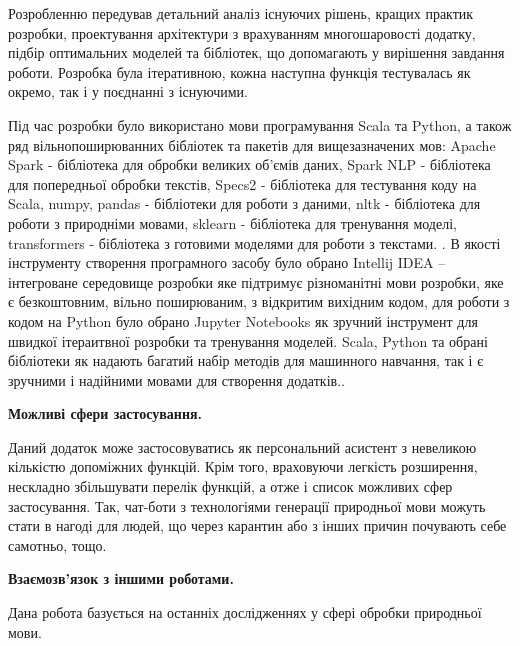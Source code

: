 Розробленню передував детальний аналіз існуючих рішень, кращих практик розробки, проектування архітектури з врахуванням многошаровості додатку, підбір оптимальних моделей та бібліотек, що допомагають у вирішення завдання роботи. Розробка була ітеративною, кожна наступна функція тестувалась як окремо, так і у поєднанні з існуючими.


Під час розробки було використано мови програмування Scala та Python, а також ряд вільнопоширюванних бібліотек та пакетів для вищезазначених мов: Apache Spark - бібліотека для обробки великих об’ємів даних, Spark NLP - бібліотека для попередньої обробки текстів, Specs2 - бібліотека для тестування коду на Scala, numpy, pandas - бібліотеки для роботи з даними, nltk - бібліотека для роботи з природніми мовами, sklearn - бібліотека для тренування моделі, transformers - бібліотека з готовими моделями для роботи з текстами. . В якості інструменту створення програмного засобу було обрано Intellij IDEA – інтегроване середовище розробки яке підтримує різноманітні мови розробки, яке є безкоштовним, вільно поширюваним, з відкритим вихідним кодом, для роботи з кодом на Python було обрано Jupyter Notebooks як зручний інструмент для швидкої ітераитвної розробки та тренування моделей. Scala, Python та обрані бібліотеки як надають багатий набір методів для машинного навчання, так і є зручними і надійними мовами для створення додатків.. 


\textbf{Можливі сфери застосування.}

Даний додаток може застосовуватись як персональний асистент з невеликою кількістю допоміжних функцій. Крім того, враховуючи легкість розширення, нескладно збільшувати перелік функцій, а отже і список можливих сфер застосування. Так, чат-боти з технологіями генерації природньої мови можуть стати в нагоді для людей, що через карантин або з інших причин почувають себе самотньо, тощо.   


\textbf{Взаємозв’язок з іншими роботами.}

Дана робота базується на останніх дослідженнях у сфері обробки природньої мови. 
